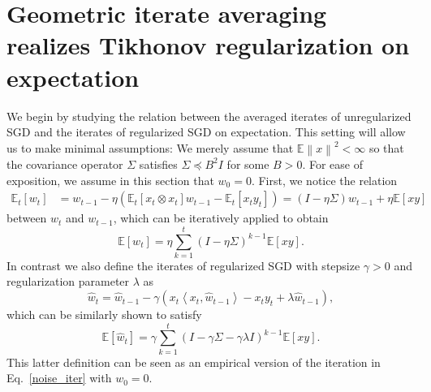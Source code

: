 \documentclass[final,12pt]{colt2018} %
\newcommand{\E}{\mathbb{E}}
\newcommand{\EE}[1]{\mathbb{E}\left[#1\right]}
\newcommand{\EEt}[1]{\mathbb{E}_t\left[#1\right]}
\newcommand{\norm}[1]{\left\|#1\right\|}
\newcommand{\pa}[1]{\left(#1\right)}
\newcommand{\wh}{\widehat}
\newcommand{\hw}{\wh{w}}
\newcommand{\iprod}[2]{\left\langle#1, #2\right\rangle}
\begin{document}
\section{Geometric iterate averaging realizes Tikhonov regularization on expectation}\label{sec:expectation}
We begin by studying the relation between the averaged iterates of unregularized SGD and the iterates of regularized SGD on expectation. 
This setting will allow us to make minimal assumptions: We merely assume that $\E{\norm{x}^2}<\infty$ so that the covariance 
operator $\Sigma$ satisfies $\Sigma \preccurlyeq B^2I$ for some $B>0$.
For ease of exposition, we assume in this section that $w_0 = 0$. First, we notice the relation 
\begin{align*}
 \EEt{w_t} &= w_{t-1} - \eta \pa{\EEt{x_{t} \otimes x_{t}}w_{t-1} - \EEt{x_{t} y_{t}}} = \pa{I-\eta \Sigma} w_{t-1} + \eta \EE{xy}
\end{align*}
between $w_t$ and $w_{t-1}$, which can be iteratively applied to obtain
\[
 \EE{w_t} = \eta \sum_{k=1}^t \pa{I - \eta \Sigma}^{k-1} \EE{x y}.
\]
In contrast we also define the iterates of regularized SGD with stepsize $\gamma > 0$ and regularization parameter $\lambda$ as
\begin{equation}\label{eq:sgdtik}
 \hw_{t} = \hw_{t-1} - \gamma \pa{x_{t} \iprod{x_{t}}{\hw_{t-1}} - x_{t} y_{t} + \lambda \hw_{t-1}}, 
\end{equation}
which can be similarly shown to satisfy
\[
 \EE{\hw_t} = \gamma \sum_{k=1}^t \pa{I - \gamma \Sigma - \gamma \lambda I}^{k-1} \EE{xy}.
\]
This latter definition can be seen as an empirical version of the iteration in Eq.~\eqref{noise_iter} with $w_0 = 0$.
\end{document}
